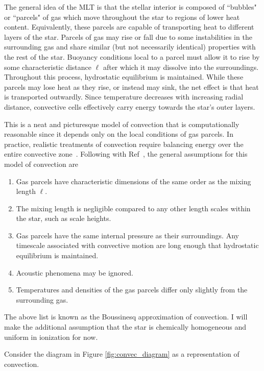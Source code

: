\documentclass[12pt]{article}
\begin{document}
The general idea of the MLT is that the stellar interior is composed of ``bubbles" or ``parcels" of gas which move throughout the star to regions of lower heat content. Equivalently, these parcels are capable of transporting heat to different layers of the star. Parcels of gas may rise or fall due to some instabilities in the surrounding gas and share similar (but not necessarily identical) properties with the rest of the star. Buoyancy conditions local to a parcel must allow it to rise by some characteristic distance $\ell$ after which it may dissolve into the surroundings. Throughout this process, hydrostatic equilibrium is maintained.  While these parcels may lose heat as they rise, or instead may sink, the net effect is that heat is transported outwardly. Since temperature decreases with increasing radial distance, convective cells effectively carry energy towards the star's outer layers.

This is a neat and picturesque model of convection that is computationally reasonable since it depends only on the local conditions of gas parcels. In practice, realistic treatments of convection require balancing energy over the entire convective zone~\cite{Christensen_Dalsgaard_2021}. Following with Ref~\cite{HK_book}, the general assumptions for this model of convection are

\begin{enumerate}
    \item Gas parcels have characteristic dimensions of the same order as the mixing length $\ell$.
    \item The mixing length is negligible compared to any other length scales within the star, such as scale heights.
    \item Gas parcels have the same internal pressure as their surroundings. Any timescale associated with convective motion are long enough that hydrostatic equilibrium is maintained. 
    \item Acoustic phenomena may be ignored.
    \item Temperatures and densities of the gas parcels differ only slightly from the surrounding gas.
\end{enumerate}
The above list is known as the Boussinesq approximation of convection. I will make the additional assumption that the star is chemically homogeneous and uniform in ionization for now.

\pagebreak

Consider the diagram in Figure \ref{fig:convec_diagram} as a representation of convection.
\end{document}

